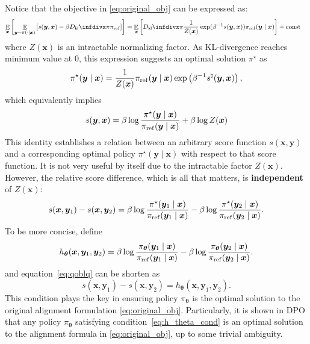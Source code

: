 \documentclass[11pt,a4paper]{article}
\begin{document}
Notice that the objective in \eqref{eq:original_obj} can be expressed as:
\begin{align*}
\mathop{\mathbb{E}}_{\bm{x}} \left[ \mathop{\mathbb{E}}_{\bm{y} \sim \pi(\cdot \mid \bm{x})} \left[  s(\bm{y}, \bm{x}) - \beta \Dkl{\pi}{\pi_{\rm ref}}\right] \right] 
&= \mathop{\mathbb{E}}_{\bm{x}} \left[  \Dkl{\pi}{\dfrac{1}{Z(\bm{x})} \exp(\beta^{-1} s(\bm{y}, \bm{x})) \pi_{\rm ref}(\bm{y} \mid \bm{x})} \right] + \text{const}
\end{align*}
where $Z(\bm{x})$ is an intractable normalizing factor.
As KL-divergence reaches minimum value at $0$, this expression suggests an optimal solution $\pi^{\star }$ as
\[
\pi^{\star }(\bm{y} \mid \bm{x}) = \dfrac{1}{Z(\bm{x})} \pi_{\rm ref}(\bm{y} \mid \bm{x}) \exp \left( \beta^{-1}  s^{\natural}(\bm{y}, \bm{x}) \right),
\] 
which equivalently implies
\[
s(\bm{y}, \bm{x}) = \beta \log \dfrac{\pi^{\star }(\bm{y} \mid \bm{x})}{\pi_{\rm ref}(\bm{y} \mid \bm{x})} + \beta \log Z(\bm{x})
\] 
This identity establishes a relation between an arbitrary score function $s(\bm{x}, \bm{y})$ and a corresponding optimal policy $\pi^{\star }(\bm{y}\mid \bm{x})$ with respect to that score function. It is not very useful by itself due to the intractable factor $Z(\bm{x})$. However, the relative score difference, which is all that matters, is \textbf{independent} of $Z(\bm{x})$:
\begin{equation}
    \label{eq:qoblq}
s(\bm{x}, \bm{y}_1) - s(\bm{x}, \bm{y}_2) = \beta \log \dfrac{\pi^{\star }(\bm{y}_1\mid \bm{x})}{\pi_{\rm ref}(\bm{y}_1 \mid \bm{x})} - \beta \log \dfrac{\pi^{\star }(\bm{y}_2\mid \bm{x})}{\pi_{\rm ref}(\bm{y}_2 \mid \bm{x})}.
\end{equation} 
To be more concise, define
\[
h_{\boldsymbol \theta}(\bm{x}, \bm{y}_1, \bm{y}_2)=\beta \log \dfrac{\pi_{\boldsymbol \theta }(\bm{y}_1\mid \bm{x})}{\pi_{\rm ref}(\bm{y}_1 \mid \bm{x})} - \beta \log \dfrac{\pi_{\boldsymbol \theta }(\bm{y}_2\mid \bm{x})}{\pi_{\rm ref}(\bm{y}_2 \mid \bm{x})}.
\]
and equation~\eqref{eq:qoblq} can be shorten as
\begin{equation}
\label{eq:h_theta_cond}
s(\bm{x}, \bm{y}_1) - s(\bm{x}, \bm{y}_2) = h_{\boldsymbol \theta}(\bm{x}, \bm{y}_1, \bm{y}_2).
\end{equation} 
This condition plays the key in ensuring policy $\pi_{\boldsymbol \theta }$ is the optimal solution to the original alignment formulation \eqref{eq:original_obj}. Particularly, it is shown in DPO that any policy $\pi_{\boldsymbol \theta}$ satisfying condition~\eqref{eq:h_theta_cond} is an optimal solution to the alignment formula in \eqref{eq:original_obj}, up to some trivial ambiguity.
\end{document}
